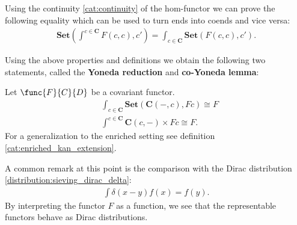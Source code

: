 
    \begin{property}
        Using the continuity \ref{cat:continuity} of the hom-functor we can prove the following equality which can be used to turn ends into coends and vice versa:
        \begin{gather}
            \mathbf{Set}\left(\int^{c\in\mathbf{C}}F(c, c), c'\right) = \int_{c\in\mathbf{C}}\mathbf{Set}\left(F(c, c), c'\right).
        \end{gather}
    \end{property}

    Using the above properties and definitions we obtain the following two statements, called the \textbf{Yoneda reduction} and \textbf{co-Yoneda lemma}:
    \begin{property}\label{cat:ninja_yoneda}
        Let $\func{F}{C}{D}$ be a covariant functor.
        \begin{align}
            &\int_{c\in\mathbf{C}}\mathbf{Set}\left(\mathbf{C}(-, c), Fc\right)\cong F\\
            &\int^{c\in\mathbf{C}}\mathbf{C}(c, -)\times Fc\cong F.
        \end{align}
        For a generalization to the enriched setting see definition \ref{cat:enriched_kan_extension}.
    \end{property}
    \begin{remark}
        A common remark at this point is the comparison with the Dirac distribution \ref{distribution:sieving_dirac_delta}:
        \begin{gather}
            \int \delta(x-y)f(x) = f(y).
        \end{gather}
        By interpreting the functor $F$ as a function, we see that the representable functors behave as Dirac distributions.
    \end{remark}


